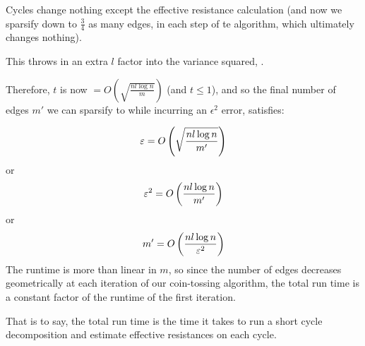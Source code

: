 \documentclass[12pt]{article}
\begin{document}
    Cycles change nothing except the effective resistance calculation (and now
    we sparsify down to $\frac{3}{4}$ as many edges, in each step of te
    algorithm, which ultimately changes nothing).

    This throws in an extra $l$ factor into the variance squared,
    .

    Therefore, $t$ is now $= O\left(\sqrt{\frac{nl \log n}{m}}\right)$ (and $t
    \leq 1$), and so the final number of edges $m'$ we can sparsify to while
    incurring an $\epsilon^2$ error, satisfies:

    \begin{align}
       \varepsilon = O\left(\sqrt{\frac{nl \log n}{m'}}\right)
    \end{align}
    or
    \begin{align}
       \varepsilon^2 = O\left(\frac{nl \log n}{m'}\right)
    \end{align}
    or
    \begin{align}
       m' = O\left(\frac{nl \log n}{\varepsilon^2}\right)
    \end{align}
    The runtime is more than linear in $m$, so since the number of edges
    decreases geometrically at each iteration of our coin-tossing algorithm,
    the total run time is a constant factor of the runtime of the first iteration.

    That is to say, the total run time is the time it takes to run a short cycle
    decomposition and estimate effective resistances on each cycle.

\end{document}
